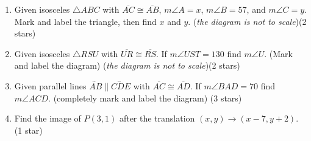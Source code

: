 \documentclass[12pt, twoside]{article}
\begin{document}
\begin{enumerate}
\newpage
  \item Given isosceles $\triangle ABC$ with $\overline{AC} \cong \overline{AB}$, $m\angle A = x$, $m\angle B = 57$, and $m\angle C=y$. Mark and label the triangle, then find $x$ and $y$. \hfill (\emph{the diagram is not to scale})(2 stars)
  \begin{flushright}
  \end{flushright}

  \item Given isosceles $\triangle RSU$ with $\overline{UR} \cong \overline{RS}$. If $m\angle UST=130$ find $m\angle U$. (Mark and label the diagram) \hfill (\emph{the diagram is not to scale})(2 stars)
  \begin{flushright}
  \end{flushright} \vspace{1cm}

    \item Given parallel lines $\overleftrightarrow{AB} \parallel \overleftrightarrow{CDE}$ with $\overline{AC} \cong \overline{AD}$. If $m\angle BAD=70$ find $m\angle ACD$. (completely mark and label the diagram) \hfill (3 stars)
    \begin{flushright}
    \end{flushright} \vspace{1.5cm}

\newpage

  \item Find the image of $P(3,1)$ after the translation $(x,y) \rightarrow (x-7,y+2)$. \hfill (1 star) \vspace{2cm}


\end{enumerate}
\end{document}
